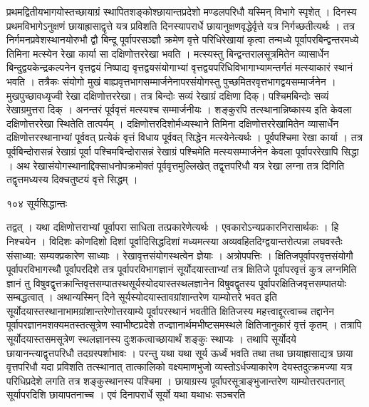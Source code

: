 \documentclass[11pt, openany]{book}
\begin{document}
\begin{sloppypar}
\noindent प्रथमद्वितीयभागयोस्तच्छायाग्रं स्थापितशङ्कोश्छायान्तप्रदेशो मण्डलपरिधौ यस्मिन् विभागे स्पृशेत् । दिनस्य प्रथमविभागेऽनुक्षणं छायाह्रासाद्वृत्ते यत्र प्रविशति दिनस्यापरार्धे छायानुक्षणवृद्धेर्वृत्ते यत्र निर्गच्छतीत्यर्थः । तत्र निर्गमनप्रवेशस्थानयोरुभौ द्वौ बिन्दू पूर्वापरसञ्ज्ञौ क्रमेण वृत्ते परिधिरेखायां कृत्वा तन्मध्ये पूर्वापरबिन्द्वन्तरमध्ये तिमिना मत्स्येन रेखा कार्या सा दक्षिणोत्तररेखा भवति । मत्स्यस्तु बिन्द्वन्तरालसूत्रमितेन व्यासार्धेन बिन्दुद्वयकेन्द्रकल्पनेन वृत्तद्वयं निष्पाद्य वृत्तद्वयसंयोगाभ्यां वृत्तद्वयपरिधिविभागाभ्यामन्तर्गतं मत्स्याकारं स्थानं भवति । तत्रैकः संयोगो मुखं बाह्यवृत्तभागसम्मार्जनेनापरसंयोगस्तु पुच्छमितरवृत्तभागद्वयसम्मार्जनेन । मुखपुच्छावध्यृज्वी रेखा दक्षिणोत्तररेखा। तत्र बिन्दोः सव्यं रेखाग्रं दक्षिणा दिक्। पश्चिमबिन्दोः सव्यं रेखाग्रमुत्तरा दिक् । अनन्तरं पूर्ववृत्तं मत्स्यश्च सम्मार्जनीयः । शङ्कुरपि तत्स्थानान्निष्कास्य इति केवला दक्षिणोत्तररेखा स्थितेति तात्पर्यम् । दक्षिणोत्तरदिशोर्मध्यस्थाने तिमिना दक्षिणोत्तररेखामितेन व्यासार्धेन दक्षिणोत्तरस्थानाभ्यां पूर्ववत् प्रत्येकं वृत्तं विधाय पूर्ववत् सिद्धेन मत्स्येनेत्यर्थः । पूर्वपश्चिमा रेखा कार्या । तत्र पूर्वबिन्दोरासन्नं रेखाग्रं पूर्वा पश्चिमबिन्दोरासन्नं रेखाग्रं पश्चिमेति मत्स्यसम्मार्जनेन केवला पूर्वापररेखापि सिद्धा । अथ रेखासंयोगस्थानाद्दिक्साधनोपक्रमोक्तं पूर्ववृत्तमुल्लिखेत् तद्वृत्तपरिधौ यत्र रेखा लग्ना तत्र दिगिति तद्वृत्तमध्यस्य दिक्चतुष्टयं वृत्ते सिद्धम् ।
\end{sloppypar}


\newpage


\noindent १०४ \hspace{4cm} सूर्यसिद्धान्तः 
\vspace{1cm}

\begin{sloppypar}
\noindent तद्वत् । यथा दक्षिणोत्तराभ्यां पूर्वापरा साधिता तत्प्रकारेणेत्यर्थः । एवकारोऽन्यप्रकारनिरासार्थकः । हि निश्चयेन । विदिशः कोणदिशो दिशां पूर्वादिसिद्धदिशां मध्यमत्स्या अव्यवहितदिग्द्वयान्तरोत्पन्ना लघवस्तैः संसाध्या: सम्यक्प्रकारेण साध्याः । रेखावृत्तसंयोगस्थत्वेन ज्ञेयाः । अत्रोपपत्तिः । क्षितिजपूर्वापरवृत्तसंयोगौ पूर्वापरविभागस्थौ पूर्वापरदिशे तत्र पूर्वापरविभागज्ञानं सूर्योदयास्ताभ्यां तत्र क्षितिजे पूर्वापरवृत्तं कुत्र लग्नमिति ज्ञानं तु विषुवद्वृत्तक्रान्तिवृत्तसम्पातस्थसूर्यस्योदयास्तस्थलज्ञानेन विषुवद्वृतस्य पूर्वापरक्षितिजवृत्तसम्पातयोः सम्बद्धत्वात् । अथान्यस्मिन् दिने सूर्यस्योदयास्तावग्रांशान्तरेण याम्योत्तरे भवत इति सूर्योदयास्तस्थानाभामग्रांशान्तरेणोत्तरयाम्ये पूर्वापरस्थानं भवतीति क्षितिजस्य महत्त्वाद्दूरत्वाच्च तद्दानेन पूर्वापरज्ञानमशक्यमतस्तत्सूत्रेण स्वाभीष्टप्रदेशे तज्ज्ञानार्थमभीष्टसमस्थले क्षितिजानुकारं वृत्तं कृतम् । तत्रापि सूर्योदयास्तसमसूत्रेण स्थलज्ञानस्य दुःशकत्वाच्छायार्थं शङ्कुः स्थाप्यः । तथापि सूर्योदये छायानन्त्याद्वृत्तपरिधौ तदग्रस्पर्शाभावः । परन्तु यथा यथा सूर्य ऊर्ध्वं भवति तथा तथा छायाह्रासाद्यत्र छाया वृत्तपरिधौ यदा प्रविशति तत्स्थानात् तात्कालिको वक्ष्यमाणभुजो व्यस्तोऽर्धज्याकारेण देयस्तदुत्क्रमज्या यत्र परिधिप्रदेशे लगति तत्र शङ्कुस्थानस्य पश्चिमा । छायाग्रस्य पूर्वापरसूत्राङ्भुजान्तरेण याम्योत्तरपतनात् सूर्यापरदिशि छायापतनाच्च । एवं दिनापरार्धे सूर्यो यथा यथाधः सञ्चरति
\end{sloppypar}
\end{document}
